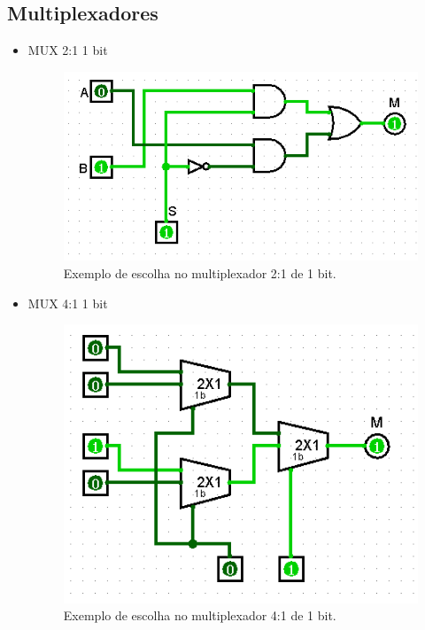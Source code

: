 \documentclass[
	12pt,				%
	openright,			%
	twoside,			%
	a4paper,			%
	english,			%
	french,				%
	spanish,			%
	brazil,				%
	]{abntex2}
\begin{document}
\begin{apendicesenv}
\newpage
\section{Multiplexadores}

\begin{itemize}
\item {MUX 2:1 1 bit}
\begin{figure}[H]
	\begin{center}
	    \includegraphics[scale=0.6]{imagens/mux211teste.png}
	\end{center}
\caption{\label{mux211teste}Exemplo de escolha no multiplexador 2:1 de 1 bit.}
\end{figure}

\item {MUX 4:1 1 bit}
\begin{figure}[H]
	\begin{center}
	    \includegraphics[scale=0.6]{imagens/mux411teste.png}
	\end{center}
\caption{\label{mux411teste}Exemplo de escolha no multiplexador 4:1 de 1 bit.}
\end{figure}


\end{itemize}
\end{apendicesenv}
\end{document}
